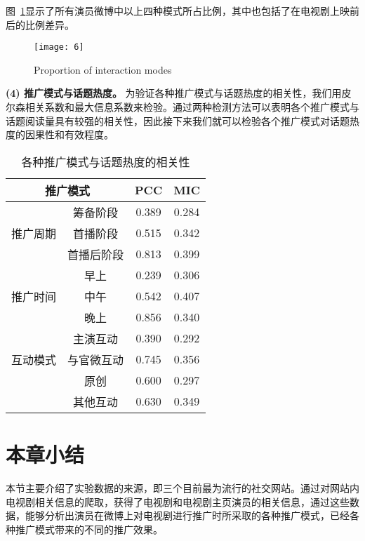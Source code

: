 图~\ref{inter3}显示了所有演员微博中以上四种模式所占比例，其中也包括了在电视剧上映前后的比例差异。

\begin{figure}[!htbp]
\centering
\texttt{[image: 6]}
\caption{Proportion of interaction modes}
\label{inter3}
\end{figure}



\textbf{(4) 推广模式与话题热度。}
为验证各种推广模式与话题热度的相关性，我们用皮尔森相关系数和最大信息系数来检验。通过两种检测方法可以表明各个推广模式与话题阅读量具有较强的相关性，因此接下来我们就可以检验各个推广模式对话题热度的因果性和有效程度。
\begin{table}[!htbp]
\centering
\caption{各种推广模式与话题热度的相关性}
\begin{tabular}{|c|c|c|c|} \hline
\multicolumn{2}{|c|}{推广模式}&PCC&MIC\\ \hline
\multirow{3}{*}{推广周期} & 筹备阶段&0.389&0.284\\%
&首播阶段&0.515&0.342\\%
&首播后阶段&0.813&0.399\\ \hline
\multirow{3}{*}{推广时间} &早上&0.239&0.306\\%
&中午&0.542&0.407\\%
&晚上&0.856&0.340\\ \hline
\multirow{3}{*}{互动模式} &主演互动&0.390&0.292\\%
&与官微互动&0.745&0.356\\%
&原创&0.600&0.297\\ 
&其他互动&0.630&0.349\\ 
\hline\end{tabular}
\end{table}

\label{sec:multifig}

\section{本章小结}

本节主要介绍了实验数据的来源，即三个目前最为流行的社交网站。通过对网站内电视剧相关信息的爬取，获得了电视剧和电视剧主页演员的相关信息，通过这些数据，能够分析出演员在微博上对电视剧进行推广时所采取的各种推广模式，已经各种推广模式带来的不同的推广效果。




















































